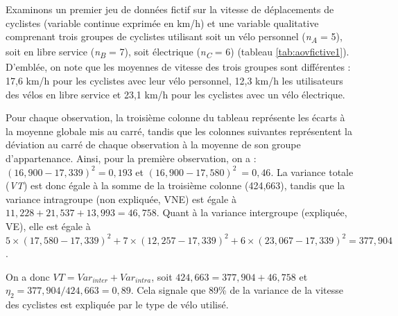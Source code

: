 \documentclass[
  11pt,
  french,
]{book}
\begin{document}
Examinons un premier jeu de données fictif sur la vitesse de déplacements de cyclistes (variable continue exprimée en km/h) et une variable qualitative comprenant trois groupes de cyclistes utilisant soit un vélo personnel (\emph{n\textsubscript{A}} = 5), soit en libre service (\emph{n\textsubscript{B}} = 7), soit électrique (\emph{n\textsubscript{C}} = 6) (tableau \ref{tab:aovfictive1}). D'emblée, on note que les moyennes de vitesse des trois groupes sont différentes : 17,6 km/h pour les cyclistes avec leur vélo personnel, 12,3 km/h les utilisateurs des vélos en libre service et 23,1 km/h pour les cyclistes avec un vélo électrique.

Pour chaque observation, la troisième colonne du tableau représente les écarts à la moyenne globale mis au carré, tandis que les colonnes suivantes représentent la déviation au carré de chaque observation à la moyenne de son groupe d'appartenance. Ainsi, pour la première observation, on a : \((16,900 - 17,339)^2 = 0,193\) et \((16,900 - 17,580)^2~ = 0,46\). La variance totale (\emph{VT}) est donc égale à la somme de la troisième colonne (424,663), tandis que la variance intragroupe (non expliquée, VNE) est égale à \(11,228+21,537+13,993=46,758\). Quant à la variance intergroupe (expliquée, VE), elle est égale à \(5\times(17,580-17,339)^2+7\times(12,257-17,339)^2+6\times(23,067-17,339)^2 = 377,904\).

On a donc \(VT = Var_{inter} + Var_{intra}\), soit \(424,663 = 377,904 + 46,758\) et \(\eta_2 = 377,904 / 424,663 = 0,89\). Cela signale que 89\% de la variance de la vitesse des cyclistes est expliquée par le type de vélo utilisé.
\end{document}
